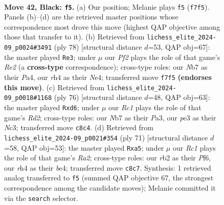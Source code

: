 \documentclass[11pt]{article}
\begin{document}
\clearpage

\begin{figure}[p]\centering
\begin{subfigure}{0.46\textwidth}\centering
\resizebox{\linewidth}{!}{%
\newchessgame
\chessboard[
  setfen={1rr5/pn3p2/1p2p1kp/8/2P4R/N1B1P3/PR3PP1/5K2 b - - 2 42},
  showmover=false,
  pgfstyle=straightmove, color=movearrow, markmove={f7-f5}
]}
\caption{}
\end{subfigure}\hfill
\begin{subfigure}{0.46\textwidth}\centering
\resizebox{\linewidth}{!}{%
\newchessgame
\chessboard[
  setfen={8/p2r3k/1p2p1rp/2p5/P3NP2/3P2P1/1P2R1K1/7R w - - 1 40},
  showmover=false,
  pgfstyle=straightmove, color=movearrow, markmove={e2-e3}
]}
\caption{}
\end{subfigure}
\\[4pt]
\begin{subfigure}{0.46\textwidth}\centering
\resizebox{\linewidth}{!}{%
\newchessgame
\chessboard[
  setfen={5k2/1p1b1pp1/p2p1r2/4p3/4P3/P1N2P1r/1PPR1K2/3R4 w - - 4 39},
  showmover=false,
  pgfstyle=straightmove, color=movearrow, markmove={d2-d6}
]}
\caption{}
\end{subfigure}\hfill
\begin{subfigure}{0.46\textwidth}\centering
\resizebox{\linewidth}{!}{%
\newchessgame
\chessboard[
  setfen={r7/rp1nk1p1/2p2p2/P5p1/4B1P1/3P3P/4PK2/R1R5 b - - 8 36},
  showmover=false,
  pgfstyle=straightmove, color=movearrow, markmove={a7-a5}
]}
\caption{}
\end{subfigure}
\caption{\textbf{Move 42, Black: \texttt{f5}.} (a) Our position; Melanie plays \texttt{f5} (\texttt{f7f5}). Panels (b)--(d) are the retrieved master positions whose correspondence most drove this move (highest QAP objective among those that transfer to it). (b) Retrieved from \texttt{lichess\_elite\_2024-09\_p0024\#3491} (ply 78) [structural distance $d$=53, QAP obj=67]: the master played \texttt{Re3}; under $\mu$ our \emph{Pf2} plays the role of that game's \emph{Re2} (a \textbf{cross-type} correspondence); cross-type roles: our \emph{N}b7 as their \emph{P}a4, our \emph{r}h4 as their \emph{N}e4; transferred move \texttt{f7f5} \textbf{(endorses this move)}. (c) Retrieved from \texttt{lichess\_elite\_2024-09\_p0018\#1168} (ply 76) [structural distance $d$=48, QAP obj=63]: the master played \texttt{Rxd6}; under $\mu$ our \emph{Rc1} plays the role of that game's \emph{Rd2}; cross-type roles: our \emph{N}b7 as their \emph{P}a3, our \emph{p}e3 as their \emph{N}c3; transferred move \texttt{c8c4}. (d) Retrieved from \texttt{lichess\_elite\_2024-09\_p0021\#354} (ply 71) [structural distance $d$=58, QAP obj=53]: the master played \texttt{Rxa5}; under $\mu$ our \emph{Rc1} plays the role of that game's \emph{Ra2}; cross-type roles: our \emph{r}b2 as their \emph{P}f6, our \emph{r}h4 as their \emph{b}e4; transferred move \texttt{c8c7}. Synthesis: 1 retrieved analog transferred to \texttt{f5} (summed QAP objective 67, the strongest correspondence among the candidate moves); Melanie committed it via the \texttt{search} selector.}
\label{fig:thought-m83}
\end{figure}
\end{document}
